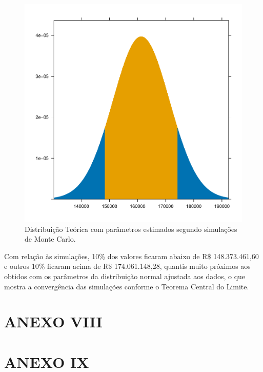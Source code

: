\documentclass[
  10pt,
  a4paper]{article}
\begin{document}
\begin{figure}[H]

{\centering \includegraphics[width=0.7\linewidth]{images/unnamed-chunk-22-1} 

}

\caption{Distribuição Teórica com parâmetros estimados segundo simulações de Monte Carlo.}\label{fig:unnamed-chunk-22}
\end{figure}

Com relação às simulações, 10\% dos valores ficaram abaixo de R\$
148.373.461,60 e outros 10\% ficaram acima de R\$ 174.061.148,28,
quantis muito próximos aos obtidos com os parâmetros da distribuição
normal ajustada aos dados, o que mostra a convergência das simulações
conforme o Teorema Central do Limite.

\newpage

\section*{ANEXO VIII}\label{anexo-viii}

\begin{landscape}



\end{landscape}

\section*{ANEXO IX}\label{anexo-ix}
\end{document}
